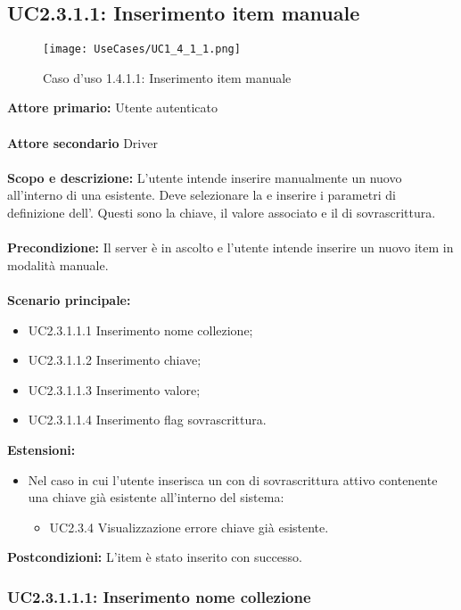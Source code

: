 \documentclass{scalatekids-article}
\begin{document}
\subsection{UC2.3.1.1: Inserimento item manuale}
\begin{figure}[H]
  \begin{center}
    \texttt{[image: UseCases/UC1\_4\_1\_1.png]}
    \caption*{Caso d'uso 1.4.1.1: Inserimento item manuale}
  \end{center}
\end{figure}
\textbf{Attore primario:} Utente autenticato\\ \\
\textbf{Attore secondario} Driver\\ \\
\textbf{Scopo e descrizione:} L'utente intende inserire manualmente un nuovo  all'interno di una  esistente. Deve selezionare la  e inserire i parametri di definizione dell'. Questi sono la chiave, il valore associato e il  di sovrascrittura.\\ \\
\textbf{Precondizione:} Il server è in ascolto e l'utente intende inserire un nuovo item in modalità manuale.\\ \\
\textbf{Scenario principale:}
\begin{itemize}
  \item UC2.3.1.1.1 Inserimento nome collezione;
  \item UC2.3.1.1.2 Inserimento chiave;
  \item UC2.3.1.1.3 Inserimento valore;
  \item UC2.3.1.1.4 Inserimento flag sovrascrittura.
\end{itemize}
\textbf{Estensioni:}
\begin{itemize}
  \item Nel caso in cui l'utente inserisca un  con  di sovrascrittura attivo contenente una chiave già esistente all'interno del sistema:
  \begin{itemize}
  \item UC2.3.4 Visualizzazione errore chiave già esistente.
  \end{itemize}
\end{itemize}
\textbf{Postcondizioni:} L'item è stato inserito con successo.

\subsubsection{UC2.3.1.1.1: Inserimento nome collezione}
\end{document}
